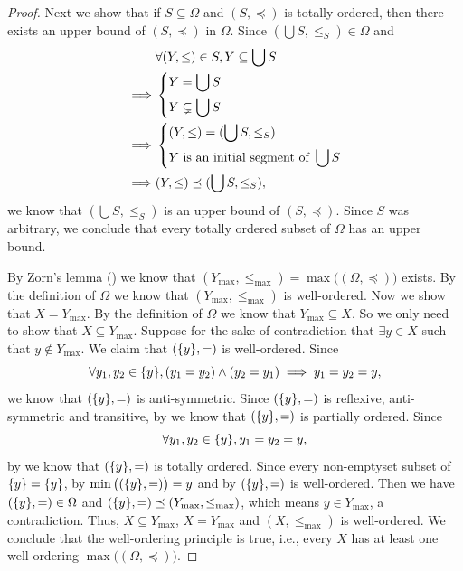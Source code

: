\begin{proof}
  Next we show that if \(S \subseteq \Omega\) and \((S, \preceq)\) is totally ordered, then there exists an upper bound of \((S, \preceq)\) in \(\Omega\).
  Since \((\bigcup S, \leq_S) \in \Omega\) and
  \begin{align*}
             & \forall (Y, \leq) \in S, Y \subseteq \bigcup S \\
    \implies & \begin{dcases}
                 Y = \bigcup S \\
                 Y \subsetneq \bigcup S
               \end{dcases}                          \\
    \implies & \begin{dcases}
                 (Y, \leq) = (\bigcup S, \leq_S) \\
                 Y \text{ is an initial segment of } \bigcup S
               \end{dcases}   \\
    \implies & (Y, \leq) \preceq (\bigcup S, \leq_S),
  \end{align*}
  we know that \((\bigcup S, \leq_S)\) is an upper bound of \((S, \preceq)\).
  Since \(S\) was arbitrary, we conclude that every totally ordered subset of \(\Omega\) has an upper bound.

  By Zorn's lemma () we know that \((Y_{\max}, \leq_{\max}) = \max\big((\Omega, \preceq)\big)\) exists.
  By the definition of \(\Omega\) we know that \((Y_{\max}, \leq_{\max})\) is well-ordered.
  Now we show that \(X = Y_{\max}\).
  By the definition of \(\Omega\) we know that \(Y_{\max} \subseteq X\).
  So we only need to show that \(X \subseteq Y_{\max}\).
  Suppose for the sake of contradiction that \(\exists y \in X\) such that \(y \notin Y_{\max}\).
  We claim that \((\set{y}, =)\) is well-ordered.
  Since
  \[
    \forall y_1, y_2 \in \set{y}, (y_1 = y_2) \land (y_2 = y_1) \implies y_1 = y_2 = y,
  \]
  we know that \((\set{y}, =)\) is anti-symmetric.
  Since \((\set{y}, =)\) is reflexive, anti-symmetric and transitive, by  we know that \((\set{y}, =)\) is partially ordered.
  Since
  \[
    \forall y_1, y_2 \in \set{y}, y_1 = y_2 = y,
  \]
  by  we know that \((\set{y}, =)\) is totally ordered.
  Since every non-emptyset subset of \(\left\lbrace y\right\rbrace = \left\lbrace y\right\rbrace\), by  \(\min\big((\set{y}, =)\big) = y\) and by  \((\set{y}, =)\) is well-ordered.
  Then we have \((\set{y}, =) \in \Omega\) and \((\set{y}, =) \preceq (Y_{\max}, \leq_{\max})\), which means \(y \in Y_{\max}\), a contradiction.
  Thus, \(X \subseteq Y_{\max}\), \(X = Y_{\max}\) and \((X, \leq_{\max})\) is well-ordered.
  We conclude that the well-ordering principle is true, i.e., every \(X\) has at least one well-ordering \(\max\big((\Omega, \preceq)\big)\).


\end{proof}
